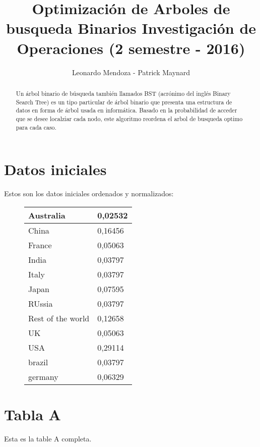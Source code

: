 \documentclass{article}
\begin{document}
\title{Optimización de Arboles de busqueda Binarios Investigación de Operaciones  (2 semestre - 2016)}
\author{Leonardo Mendoza - Patrick Maynard}

\maketitle

\begin{abstract}
Un árbol binario de búsqueda también llamados BST (acrónimo del inglés Binary Search Tree) es un tipo particular de árbol binario que presenta una estructura de datos en forma de árbol usada en informática. Basado en la probabilidad de acceder que se desee localziar cada nodo, este algoritmo reordena el arbol de busqueda optimo para cada caso. 
\end{abstract}

\section{Datos iniciales}

Estos son los datos iniciales ordenados y normalizados: 

\centering 
\begin{figure}[H]
\label{my-label2}
\begin{tabular}{|l|l|} 
 \hline Australia & 0,02532 \\ \hline
 China & 0,16456 \\ \hline
 France & 0,05063 \\ \hline
 India & 0,03797 \\ \hline
 Italy & 0,03797 \\ \hline
 Japan & 0,07595 \\ \hline
 RUssia & 0,03797 \\ \hline
 Rest of the world & 0,12658 \\ \hline
 UK & 0,05063 \\ \hline
 USA & 0,29114 \\ \hline
 brazil & 0,03797 \\ \hline
 germany & 0,06329 \\ \hline
\end{tabular}
\end{figure}
    
\section{Tabla A}
Esta es la table A completa.
\end{document}
